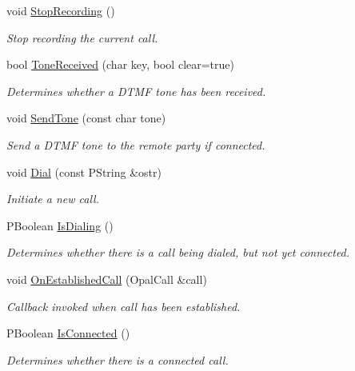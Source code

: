 \begin{CompactItemize}
void \hyperlink{classTelephonyIfc_14352867be8fe5f0fcf501701e9052b2}{StopRecording} ()
\begin{CompactList}\small\item\em Stop recording the current call. \item\end{CompactList}\item 
bool \hyperlink{classTelephonyIfc_60cba0b92e2f33357c063c251fae2997}{ToneReceived} (char key, bool clear=true)
\begin{CompactList}\small\item\em Determines whether a DTMF tone has been received. \item\end{CompactList}\item 
void \hyperlink{classTelephonyIfc_ac6179d75a2c623e05ccb345b45741f1}{SendTone} (const char tone)
\begin{CompactList}\small\item\em Send a DTMF tone to the remote party if connected. \item\end{CompactList}\item 
void \hyperlink{classTelephonyIfc_2e0adbafa63cd9c07a1c1c6ce68bf933}{Dial} (const PString \&ostr)
\begin{CompactList}\small\item\em Initiate a new call. \item\end{CompactList}\item 
PBoolean \hyperlink{classTelephonyIfc_074e1d67c95ce1e66d346bb7315d5dcd}{IsDialing} ()
\begin{CompactList}\small\item\em Determines whether there is a call being dialed, but not yet connected. \item\end{CompactList}\item 
void \hyperlink{classTelephonyIfc_a482ebd5daf3bf5d69ec40a46a0616e9}{OnEstablishedCall} (OpalCall \&call)
\begin{CompactList}\small\item\em Callback invoked when call has been established. \item\end{CompactList}\item 
PBoolean \hyperlink{classTelephonyIfc_2a68749063e9e0c45ac31e8e44fa0849}{IsConnected} ()
\begin{CompactList}\small\item\em Determines whether there is a connected call. \item\end{CompactList}\item 

\end{CompactItemize}
